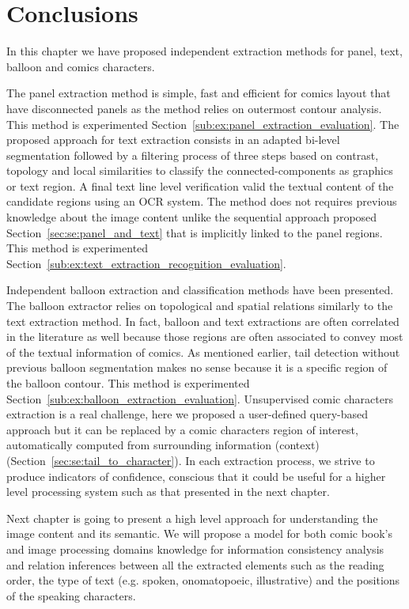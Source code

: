 
\section{Conclusions}
\label{sec:in:conclusion}

In this chapter we have proposed independent extraction methods for panel, text, balloon and comics characters.

The panel extraction method is simple, fast and efficient for comics layout that have disconnected panels as the method relies on outermost contour analysis.
This method is experimented Section~\ref{sub:ex:panel_extraction_evaluation}.
The proposed approach for text extraction consists in an adapted bi-level segmentation followed by a filtering process of three steps based on contrast, topology and local similarities to classify the connected-components as graphics or text region.
A final text line level verification valid the textual content of the candidate regions using an OCR system.
The method does not requires previous knowledge about the image content unlike the sequential approach proposed Section~\ref{sec:se:panel_and_text} that is implicitly linked to the panel regions.
This method is experimented Section~\ref{sub:ex:text_extraction_recognition_evaluation}.

Independent balloon extraction and classification methods have been presented.
The balloon extractor relies on topological and spatial relations similarly to the text extraction method.
In fact, balloon and text extractions are often correlated in the literature as well because those regions are often associated to convey most of the textual information of comics.
As mentioned earlier, tail detection without previous balloon segmentation makes no sense because it is a specific region of the balloon contour.
This method is experimented Section~\ref{sub:ex:balloon_extraction_evaluation}.
Unsupervised comic characters extraction is a real challenge, here we proposed a user-defined query-based approach but it can be replaced by a comic characters region of interest, automatically computed from surrounding information (context) (Section~\ref{sec:se:tail_to_character}).
In each extraction process, we strive to produce indicators of confidence, conscious that it could be useful for a higher level processing system such as that presented in the next chapter.

Next chapter is going to present a high level approach for understanding the image content and its semantic.
We will propose a model for both comic book's and image processing domains knowledge for information consistency analysis and relation inferences between all the extracted elements such as the reading order, the type of text (e.g. spoken, onomatopoeic, illustrative) and the positions of the speaking characters.

